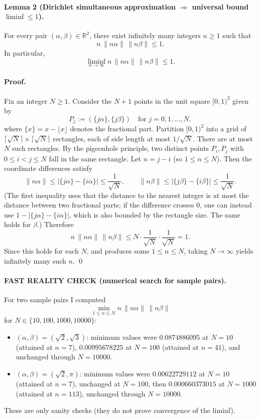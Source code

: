 \paragraph{Lemma 2 (Dirichlet simultaneous approximation $\Rightarrow$ universal bound $\liminf\le 1$).}
For every pair $(\alpha,\beta)\in\mathbb{R}^2$, there exist infinitely many integers $n\ge 1$ such that
\[n\,\|n\alpha\|\,\|n\beta\| \le 1.
\]
In particular,
\[\liminf_{n\to\infty} n\,\|n\alpha\|\,\|n\beta\| \le 1.
\]

\paragraph{Proof.}
Fix an integer $N\ge 1$.
Consider the $N+1$ points in the unit square $[0,1)^2$ given by
\[P_j := (\{j\alpha\},\{j\beta\})\quad\text{for }j=0,1,\dots,N,
\]
where $\{x\}=x-\lfloor x\rfloor$ denotes the fractional part.
Partition $[0,1)^2$ into a grid of $\lceil\sqrt N\rceil\times\lceil\sqrt N\rceil$ rectangles, each of side length at most $1/\sqrt N$.
There are at most $N$ such rectangles.
By the pigeonhole principle, two distinct points $P_i,P_j$ with $0\le i<j\le N$ fall in the same rectangle.
Let $n=j-i$ (so $1\le n\le N$).
Then the coordinate differences satisfy
\[\|n\alpha\| \le |\{j\alpha\}-\{i\alpha\}| \le \frac{1}{\sqrt N},\qquad
  \|n\beta\| \le |\{j\beta\}-\{i\beta\}| \le \frac{1}{\sqrt N}.
\]
(The first inequality uses that the distance to the nearest integer is at most the distance between two fractional parts; if the difference crosses $0$, one can instead use $1-|\{j\alpha\}-\{i\alpha\}|$, which is also bounded by the rectangle size. The same holds for $\beta$.)
Therefore
\[n\,\|n\alpha\|\,\|n\beta\| \le N\cdot \frac{1}{\sqrt N}\cdot\frac{1}{\sqrt N}=1.
\]
Since this holds for each $N$, and produces some $1\le n\le N$, taking $N\to\infty$ yields infinitely many such $n$.
\qed

\paragraph{FAST REALITY CHECK (numerical search for sample pairs).}
For two sample pairs I computed
\[\min_{1\le n\le N} n\,\|n\alpha\|\,\|n\beta\|\]
for $N\in\{10,100,1000,10000\}$:
\begin{itemize}
\item $(\alpha,\beta)=(\sqrt2,\sqrt3)$: minimum values were
$0.0874886095$ at $N=10$ (attained at $n=7$),
$0.00995678225$ at $N=100$ (attained at $n=41$), and unchanged through $N=10000$.
\item $(\alpha,\beta)=(\sqrt2,\pi)$: minimum values were
$0.00622729112$ at $N=10$ (attained at $n=7$),
unchanged at $N=100$,
then $0.000660373015$ at $N=1000$ (attained at $n=113$), unchanged through $N=10000$.
\end{itemize}
These are only sanity checks (they do not prove convergence of the liminf).

